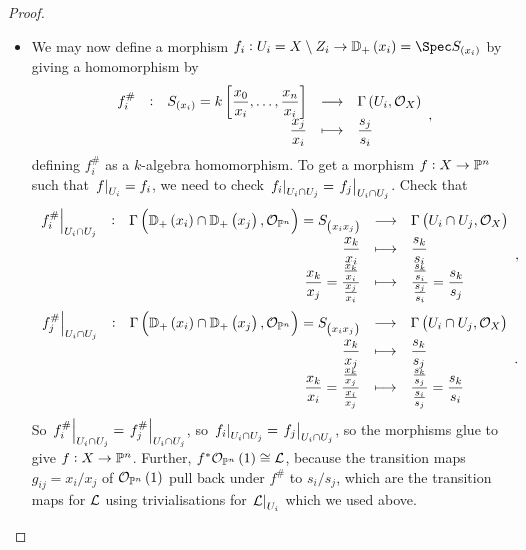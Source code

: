 \begin{proof}
\begin{itemize}
\begin{itemize}

\item We may now define a morphism $ f_i : U_i = X \setminus Z_i \to \DD_+\br{x_i} = \Spec S_{\br{x_i}} $ by giving a homomorphism by
$$ \function[f_i^\#]{S_{\br{x_i}} = k\sbr{\dfrac{x_0}{x_i}, \dots, \dfrac{x_n}{x_i}}}{\Gamma\br{U_i, \OOO_X}}{\dfrac{x_j}{x_i}}{\dfrac{s_j}{s_i}}, $$
defining $ f_i^\# $ as a $ k $-algebra homomorphism. To get a morphism $ f : X \to \mathbb{P}^n $ such that $ \left. f \right|_{U_i} = f_i $, we need to check $ \left. f_i \right|_{U_i \cap U_j} = \left. f_j \right|_{U_i \cap U_j} $. Check that
$$ \functions[\eval{f_i^\#}_{U_i \cap U_j}]{\Gamma\br{\DD_+\br{x_i} \cap \DD_+\br{x_j}, \OOO_{\PP^n}} = S_{\br{x_ix_j}}}{\Gamma\br{U_i \cap U_j, \OOO_X}}{\dfrac{x_k}{x_i}}{\dfrac{s_k}{s_i}}{\dfrac{x_k}{x_j} = \dfrac{\tfrac{x_k}{x_i}}{\tfrac{x_j}{x_i}}}{\dfrac{\tfrac{s_k}{s_i}}{\tfrac{s_j}{s_i}} = \dfrac{s_k}{s_j}}, $$
$$ \functions[\eval{f_j^\#}_{U_i \cap U_j}]{\Gamma\br{\DD_+\br{x_i} \cap \DD_+\br{x_j}, \OOO_{\PP^n}} = S_{\br{x_ix_j}}}{\Gamma\br{U_i \cap U_j, \OOO_X}}{\dfrac{x_k}{x_j}}{\dfrac{s_k}{s_j}}{\dfrac{x_k}{x_i} = \dfrac{\tfrac{x_k}{x_j}}{\tfrac{x_i}{x_j}}}{\dfrac{\tfrac{s_k}{s_j}}{\tfrac{s_i}{s_j}} = \dfrac{s_k}{s_i}}. $$
So $ \left. f_i^\# \right|_{U_i \cap U_j} = \left. f_j^\# \right|_{U_i \cap U_j} $, so $ \left. f_i \right|_{U_i \cap U_j} = \left. f_j \right|_{U_i \cap U_j} $, so the morphisms glue to give $ f : X \to \mathbb{P}^n $. Further, $ f^*\OOO_{\PP^n}\br{1} \cong \LLL $, because the transition maps $ g_{ij} = x_i / x_j $ of $ \OOO_{\PP^n}\br{1} $ pull back under $ f^\# $ to $ s_i / s_j $, which are the transition maps for $ \mathcal{L} $ using trivialisations for $ \left. \mathcal{L} \right|_{U_i} $ which we used above.

\pagebreak


\end{itemize}
\end{itemize}
\end{proof}
